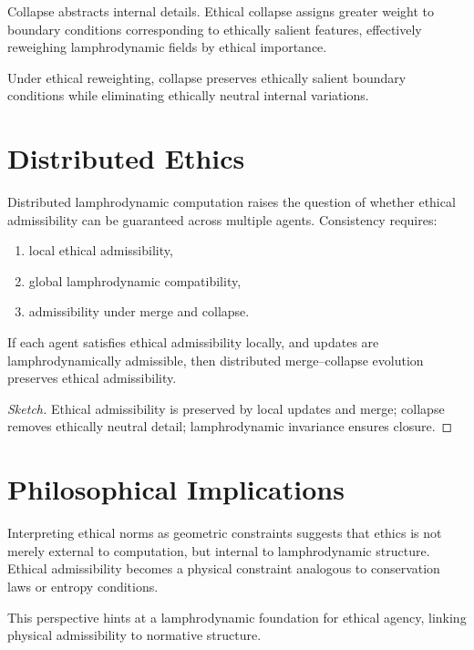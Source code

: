 Collapse abstracts internal details. Ethical collapse assigns greater
weight to boundary conditions corresponding to ethically salient
features, effectively reweighing lamphrodynamic fields by ethical
importance.

\begin{proposition}
Under ethical reweighting, collapse preserves ethically salient boundary
conditions while eliminating ethically neutral internal variations.
\end{proposition}


\section{Distributed Ethics}

Distributed lamphrodynamic computation raises the question of whether
ethical admissibility can be guaranteed across multiple agents.
Consistency requires:
\begin{enumerate}
\item local ethical admissibility,
\item global lamphrodynamic compatibility,
\item admissibility under merge and collapse.
\end{enumerate}

\begin{theorem}
If each agent satisfies ethical admissibility locally, and updates are
lamphrodynamically admissible, then distributed merge--collapse evolution
preserves ethical admissibility.
\end{theorem}

\begin{proof}[Sketch]
Ethical admissibility is preserved by local updates and merge; collapse
removes ethically neutral detail; lamphrodynamic invariance ensures
closure.
\end{proof}


\section{Philosophical Implications}

Interpreting ethical norms as geometric constraints suggests that ethics
is not merely external to computation, but internal to lamphrodynamic
structure. Ethical admissibility becomes a physical constraint analogous
to conservation laws or entropy conditions.

\begin{remark}
This perspective hints at a lamphrodynamic foundation for ethical
agency, linking physical admissibility to normative structure.
\end{remark}


